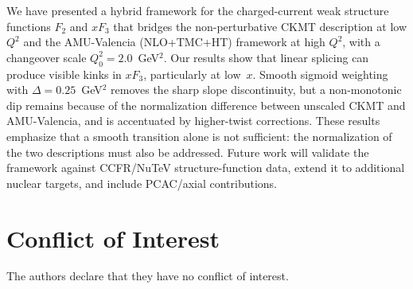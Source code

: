 \documentclass[10pt,twocolumn]{article}
\begin{document}
We have presented a hybrid framework for the charged-current weak
structure functions $F_2$ and $xF_3$ that bridges the
non-perturbative CKMT description at low $Q^2$ and the AMU-Valencia
(NLO+TMC+HT) framework at high $Q^2$, with a changeover scale
$Q^2_0 = 2.0$~GeV$^2$. Our results show that linear splicing can produce
visible kinks in $xF_3$, particularly at low~$x$. Smooth sigmoid weighting
with $\Delta = 0.25$~GeV$^2$ removes the sharp slope discontinuity, but a
non-monotonic dip remains because of the normalization difference between
unscaled CKMT and AMU-Valencia, and is accentuated by higher-twist corrections.
These results emphasize that a smooth transition alone is not sufficient:
the normalization of the two descriptions must also be addressed. Future
work will validate the framework against CCFR/NuTeV structure-function data,
extend it to additional nuclear targets, and include PCAC/axial contributions.

\section*{Conflict of Interest}

The authors declare that they have no conflict of interest.
\end{document}
